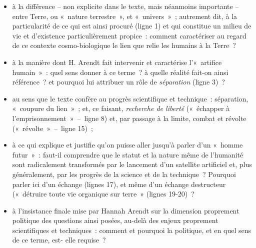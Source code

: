 {\begin{itemize}
\item à la différence – non explicite dans le texte, mais néanmoins importante – entre
Terre, ou «~nature terrestre~», et «~univers~»~; autrement dit, à la particularité de
ce qui est ainsi procuré (ligne 1) et qui constitue un milieu de vie et d'existence
particulièrement propice~: comment caractériser au regard de ce contexte cosmo-biologique le lien que relie les humains à la Terre~?
\item à la manière dont H. Arendt fait intervenir et caractérise l'«~artifice humain~»~: quel
sens donner à ce terme~? à quelle réalité fait-on ainsi référence~? et pourquoi lui
attribuer un rôle de \textit{séparation} (ligne 3)~?
\item au sens que le texte confère au progrès scientifique et technique~: séparation,
«~coupure du lien~»~; et, ce faisant, \textit{recherche de liberté} («~échapper à
l'emprisonnement~»~--~ligne 8) et, par passage à la limite, combat et révolte
(«~révolte~»~--~ligne 15)~;
\item à ce qui explique et justifie qu'on puisse aller jusqu'à parler d'un «~homme
futur~»~: faut-il comprendre que le statut et la nature même de l'humanité
sont radicalement transformés par le lancement d'un satellite artificiel et, plus
généralement, par les progrès de la science et de la technique~? Pourquoi parler ici
d'un échange (lignes 17), et même d'un échange destructeur («~détruire toute vie
organique sur terre~» (lignes 19-20)~?
\item à l'insistance finale mise par Hannah Arendt sur la dimension proprement politique
des questions ainsi posées, au-delà des enjeux proprement scientifiques et
techniques~: comment et pourquoi la politique, et en quel sens de ce terme, est-
elle requise~?
\end{itemize}}%
